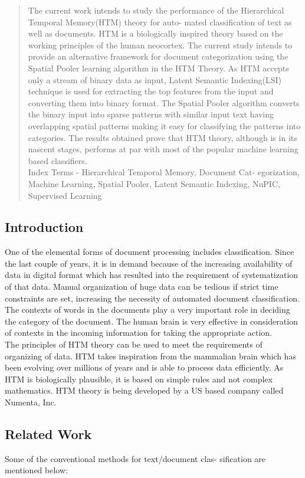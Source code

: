 \documentclass[12pt]{article}
\begin{document}
\begin{multicols}{2}
\begin{abstract}
 The current work intends to study the performance
of the Hierarchical Temporal Memory(HTM) theory for auto-
mated classification of text as well as documents. HTM is a
biologically inspired theory based on the working principles of
the human neocortex. The current study intends to provide
an alternative framework for document categorization using
the Spatial Pooler learning algorithm in the HTM Theory. As
HTM accepts only a stream of binary data as input, Latent
Semantic Indexing(LSI) technique is used for extracting the
top features from the input and converting them into binary
format. The Spatial Pooler algorithm converts the binary input
into sparse patterns with similar input text having overlapping
spatial patterns making it easy for classifying the patterns into
categories. The results obtained prove that HTM theory, although
is in its nascent stages, performs at par with most of the popular
machine learning based classifiers.\\
Index Terms - Hierarchical Temporal Memory, Document Cat-
egorization, Machine Learning, Spatial Pooler, Latent Semantic
Indexing, NuPIC, Supervised Learning
\end{abstract}
\subsection{Introduction}
One of the elemental forms of document processing includes
classification. Since the last couple of years, it is in demand
because of the increasing availability of data in digital format
which has resulted into the requirement of systematization of
that data. Manual organization of huge data can be tedious
if strict time constraints are set, increasing the necessity of
automated document classification. The contexts of words in
the documents play a very important role in deciding the
category of the document. The human brain is very effective
in consideration of contexts in the incoming information for
taking the appropriate action.\\
The principles of HTM theory can be used to meet the
requirements of organizing of data. HTM takes inspiration
from the mammalian brain which has been evolving over
millions of years and is able to process data efficiently. As
HTM is biologically plausible, it is based on simple rules and
not complex mathematics. HTM theory is being developed by
a US based company called Numenta, Inc.
\subsection{Related Work}
Some of the conventional methods for text/document clas-
sification are mentioned below:

\end{multicols}
\end{document}
